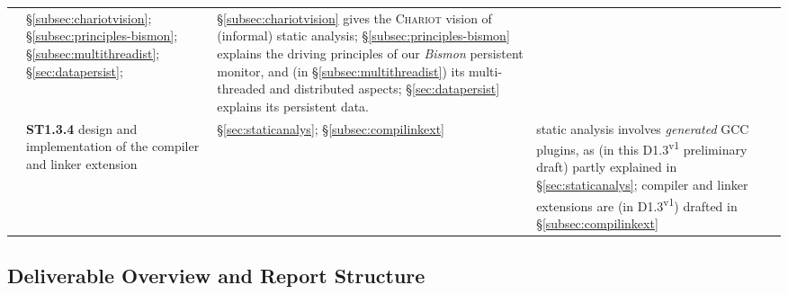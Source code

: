 \begin{table}[!htbp]
\begin{relsize}{-1.3}
\begin{tabular}{|p{}|p{}|p{}|p{}|}
      & \S\ref{subsec:chariotvision};  \S\ref{subsec:principles-bismon};  \S\ref{subsec:multithreadist};  \S\ref{sec:datapersist};
      &  \S\ref{subsec:chariotvision} gives the \textsc{Chariot} vision of (informal) static analysis;
      \S\ref{subsec:principles-bismon} explains the driving principles of our \emph{Bismon} persistent monitor,
      and (in  \S\ref{subsec:multithreadist}) its multi-threaded and distributed aspects;
      \S\ref{sec:datapersist} explains its persistent data.  \\
      \cline{2-4}
      & \textbf{ST1.3.4} design and implementation of the compiler and linker extension
      & \S\ref{sec:staticanalys}; \S\ref{subsec:compilinkext}
      & static analysis involves \emph{generated} GCC plugins, as (in this D1.3\textsuperscript{v1} preliminary draft)
      partly explained in \S\ref{sec:staticanalys}; compiler and linker extensions
      are (in D1.3\textsuperscript{v1}) drafted in \S\ref{subsec:compilinkext}  \\
      \hline
       
      
    \end{tabular}
 \end{relsize}
\end{table}

\subsection{Deliverable Overview and Report Structure}
\label{subsec:overview}

